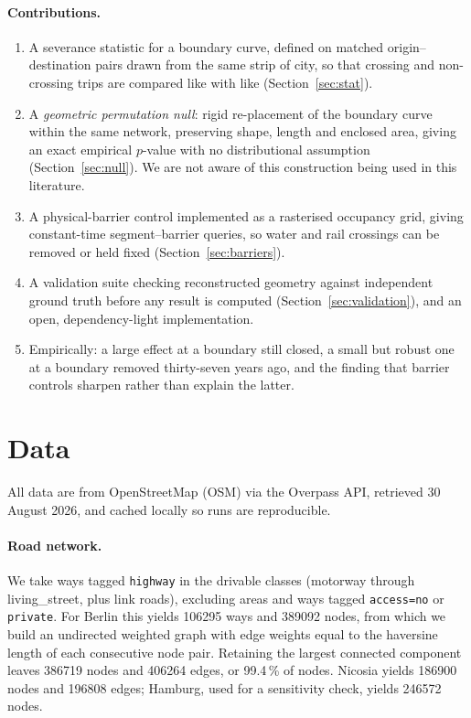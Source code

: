 \documentclass[11pt,a4paper]{article}
\begin{document}
\paragraph{Contributions.}
\begin{enumerate}\itemsep2pt
  \item A severance statistic for a boundary curve, defined on matched
    origin--destination pairs drawn from the same strip of city, so that
    crossing and non-crossing trips are compared like with like
    (Section~\ref{sec:stat}).
  \item A \emph{geometric permutation null}: rigid re-placement of the boundary
    curve within the same network, preserving shape, length and enclosed area,
    giving an exact empirical $p$-value with no distributional assumption
    (Section~\ref{sec:null}). We are not aware of this construction being used
    in this literature.
  \item A physical-barrier control implemented as a rasterised occupancy grid,
    giving constant-time segment--barrier queries, so water and rail crossings
    can be removed or held fixed (Section~\ref{sec:barriers}).
  \item A validation suite checking reconstructed geometry against independent
    ground truth before any result is computed (Section~\ref{sec:validation}),
    and an open, dependency-light implementation.
  \item Empirically: a large effect at a boundary still closed, a small but
    robust one at a boundary removed thirty-seven years ago, and the finding
    that barrier controls sharpen rather than explain the latter.
\end{enumerate}

\section{Data}

All data are from OpenStreetMap (OSM) via the Overpass API, retrieved
30 August 2026, and cached locally so runs are reproducible.

\paragraph{Road network.} We take ways tagged \texttt{highway} in the drivable
classes (motorway through living\_street, plus link roads), excluding areas and
ways tagged \texttt{access=no} or \texttt{private}. For Berlin this yields
106295 ways and 389092 nodes, from which we build an
undirected weighted graph with edge weights equal to the haversine length of
each consecutive node pair. Retaining the largest connected component leaves
386719 nodes and 406264 edges, or 99.4\,\%
of nodes. Nicosia yields 186900 nodes and 196808 edges;
Hamburg, used for a sensitivity check, yields 246572 nodes.
\end{document}
